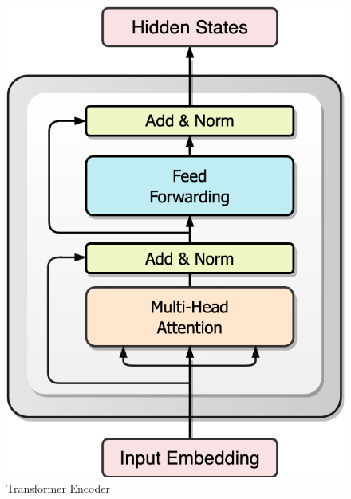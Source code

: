 \documentclass{article}
\begin{document}
\begin{figure}[ht]
  \begin{minipage}[b]{0.33\textwidth}
    \centering
    \includegraphics[width=0.73\linewidth]{pics/TransformerEncoder.drawio.png}
    \caption{Transformer Encoder}
    \label{fig:subim1}
  \end{minipage}
  \begin{minipage}[b]{0.33\textwidth}
    \centering

\end{minipage}
\end{figure}
\end{document}
